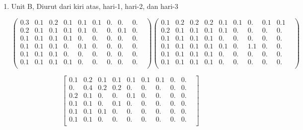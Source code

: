 \documentclass[12pt,]{article}
\begin{document}
\begin{enumerate}
\[\begin{matrix}
			0.1&0.1&0.1&0.&0.&0.&0.&0.&0.&\\

			0.1&0.1&0.1&0.1&0.&0.&0.&0.&0.&\\

			0.2&0.1&0.1&0.&0.&0.&0.&0.&0.&\\

			0.1&0.&0.1&0.&0.1&0.&0.&0.&0.&\\
		\end{matrix}
		\right]\]
		
		\newpage
		\item Unit B, Diurut dari kiri atas, hari-1, hari-2, dan hari-3
		
		\[ \left( \begin{matrix}
			0.3&0.1&0.2&0.1&0.1&0.1&0.&0.&0.&\\

			0.2&0.1&0.1&0.1&0.1&0.&0.&0.1&0.&\\

			0.1&0.1&0.1&0.1&0.&0.&0.&0.&0.&\\

			0.1&0.1&0.1&0.&0.1&0.&0.&0.&0.&\\

			0.1&0.1&0.1&0.&0.&0.&0.&0.&0.&\\

			0.1&0.1&0.1&0.1&0.&0.&0.&0.&0.&\\
		\end{matrix} \right) 
		\left( \begin{matrix}
			0.1&0.2&0.2&0.2&0.1&0.1&0.&0.1&0.1\\

			0.2&0.1&0.1&0.1&0.1&0.&0.&0.&0.&\\

			0.1&0.1&0.1&0.1&0.&0.&0.&0.&0.&\\

			0.1&0.1&0.1&0.1&0.1&0.&1.1&0.&0.&\\

			0.1&0.1&0.1&0.1&0.&0.&0.&0.&0.&\\

			0.1&0.1&0.1&0.1&0.&0.&0.&0.&0.&\\
		\end{matrix} \right)
		\]
		
		\[\left[
		\begin{matrix}
			0.1&0.2&0.1&0.1&0.1&0.1&0.1&0.&0.&\\

			0.&0.4&0.2&0.2&0.&0.&0.&0.&0.&\\

			0.2&0.1&0.&0.&0.1&0.&0.&0.&0.&\\

			0.1&0.1&0.&0.1&0.&0.&0.&0.&0.&\\

			0.1&0.1&0.1&0.&0.&0.&0.&0.&0.&\\

			0.1&0.1&0.&0.&0.&0.&0.&0.&0.&\\
		\end{matrix}
		\right]\]

	\end{enumerate}
\end{document}
